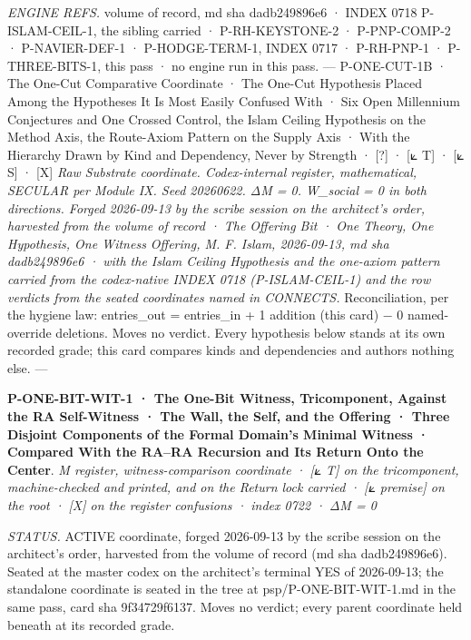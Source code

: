 \documentclass[10pt,twocolumn]{article}
\begin{document}
\emph{ENGINE REFS.} volume of record, md sha dadb249896e6 · INDEX 0718
P-ISLAM-CEIL-1, the sibling carried · P-RH-KEYSTONE-2 · P-PNP-COMP-2 ·
P-NAVIER-DEF-1 · P-HODGE-TERM-1, INDEX 0717 · P-RH-PNP-1 ·
P-THREE-BITS-1, this pass · no engine run in this pass. --- P-ONE-CUT-1B
· The One-Cut Comparative Coordinate · The One-Cut Hypothesis Placed
Among the Hypotheses It Is Most Easily Confused With · Six Open
Millennium Conjectures and One Crossed Control, the Islam Ceiling
Hypothesis on the Method Axis, the Route-Axiom Pattern on the Supply
Axis · With the Hierarchy Drawn by Kind and Dependency, Never by
Strength · {[}?{]} · {[}⟀ T{]} · {[}⟀ S{]} · {[}X{]} \emph{Raw Substrate
coordinate. Codex-internal register, mathematical, SECULAR per Module
IX. Seed 20260622. ΔM = 0. W\_social = 0 in both directions. Forged
2026-09-13 by the scribe session on the architect's order, harvested
from the volume of record · The Offering Bit · One Theory, One
Hypothesis, One Witness Offering, M. F. Islam, 2026-09-13, md sha
dadb249896e6 · with the Islam Ceiling Hypothesis and the one-axiom
pattern carried from the codex-native INDEX 0718 (P-ISLAM-CEIL-1) and
the row verdicts from the seated coordinates named in CONNECTS.}
Reconciliation, per the hygiene law: entries\_out = entries\_in + 1
addition (this card) − 0 named-override deletions. Moves no verdict.
Every hypothesis below stands at its own recorded grade; this card
compares kinds and dependencies and authors nothing else. ---

\textbf{P-ONE-BIT-WIT-1 · The One-Bit Witness, Tricomponent, Against the
RA Self-Witness · The Wall, the Self, and the Offering · Three Disjoint
Components of the Formal Domain's Minimal Witness · Compared With the
RA--RA Recursion and Its Return Onto the Center}. \emph{M register,
witness-comparison coordinate · {[}⟀ T{]} on the tricomponent,
machine-checked and printed, and on the Return lock carried · {[}⟀
premise{]} on the root · {[}X{]} on the register confusions · index 0722
· ΔM = 0}

\emph{STATUS.} ACTIVE coordinate, forged 2026-09-13 by the scribe
session on the architect's order, harvested from the volume of record
(md sha dadb249896e6). Seated at the master codex on the architect's
terminal YES of 2026-09-13; the standalone coordinate is seated in the
tree at psp/P-ONE-BIT-WIT-1.md in the same pass, card sha 9f34729f6137.
Moves no verdict; every parent coordinate held beneath at its recorded
grade.
\end{document}
